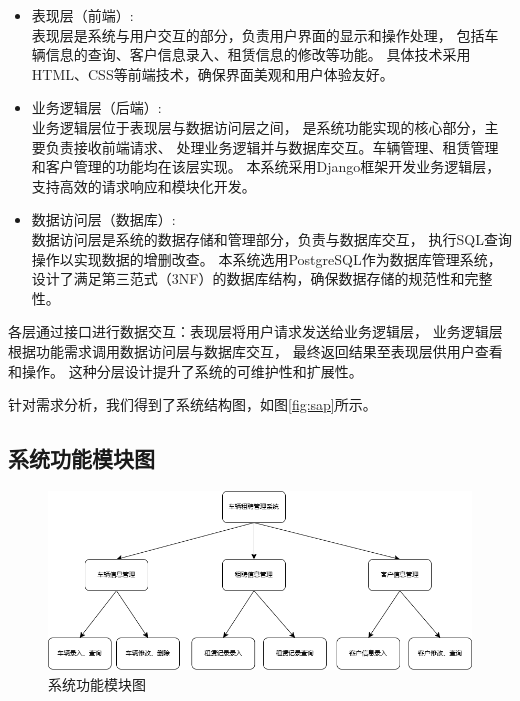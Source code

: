 \documentclass[UTF8,a4paper,12pt]{ctexart}
\begin{document}
\begin{itemize}
    \item 表现层（前端）:\\
    表现层是系统与用户交互的部分，负责用户界面的显示和操作处理，
    包括车辆信息的查询、客户信息录入、租赁信息的修改等功能。
    具体技术采用HTML、CSS等前端技术，确保界面美观和用户体验友好。
    \item 业务逻辑层（后端）:\\
    业务逻辑层位于表现层与数据访问层之间，
    是系统功能实现的核心部分，主要负责接收前端请求、
    处理业务逻辑并与数据库交互。车辆管理、租赁管理和客户管理的功能均在该层实现。
    本系统采用Django框架开发业务逻辑层，
    支持高效的请求响应和模块化开发。
    
    \item 数据访问层（数据库）:\\
    数据访问层是系统的数据存储和管理部分，负责与数据库交互，
    执行SQL查询操作以实现数据的增删改查。
    本系统选用PostgreSQL作为数据库管理系统，
    设计了满足第三范式（3NF）的数据库结构，确保数据存储的规范性和完整性。
\end{itemize}

各层通过接口进行数据交互：表现层将用户请求发送给业务逻辑层，
业务逻辑层根据功能需求调用数据访问层与数据库交互，
最终返回结果至表现层供用户查看和操作。
这种分层设计提升了系统的可维护性和扩展性。

针对需求分析，我们得到了系统结构图，如图\ref{fig:sap}所示。

\subsection{系统功能模块图}

\begin{figure}[htbp]  %
    \centering  %
    \includegraphics[width=1\textwidth]{pic/system_function_modules.png}  %
    \caption{系统功能模块图}  %
    \label{fig:sfm}  %
\end{figure}
\end{document}
